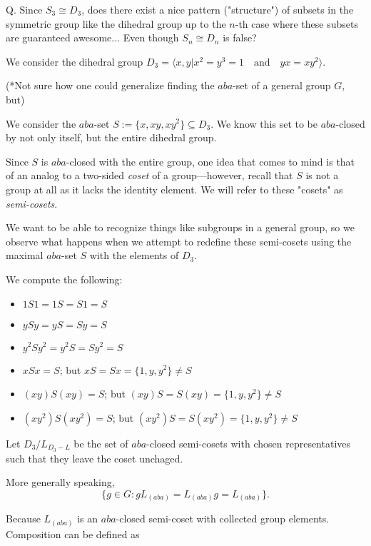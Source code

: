\documentclass[a4paper,12pt]{article}
\begin{document}
Q. Since $S_3 \cong D_3$, does there exist a nice pattern ("structure") of subsets in the symmetric group like the dihedral group up to the $n$-th case where these subsets are guaranteed awesome... Even though $S_n \cong D_n$ is false?

\newpage

We consider the dihedral group $D_{3} = \langle x, y | x^2 = y^3 = 1 \quad \text{and} \quad yx = xy^2\rangle$.

(*Not sure how one could generalize finding the $aba$-set of a general group $G$, but)

We consider the $aba$-set $S := \{x, xy, xy^2\} \subseteq D_{3}$. We know this set to be $aba$-closed by not only itself, but the entire dihedral group.

Since $S$ is $aba$-closed with the entire group, one idea that comes to mind is that of an analog to a two-sided \textit{coset} of a group---however, recall that $S$ is not a group at all as it lacks the identity element. We will refer to these "cosets" as \textit{semi-cosets}.

We want to be able to recognize things like subgroups in a general group, so we observe what happens when we attempt to redefine these semi-cosets using the maximal $aba$-set $S$ with the elements of $D_{3}$.

We compute the following:

\begin{itemize}
    \item $1 S 1 = 1 S = S 1 = S$
    \item $y S y = y S = S y = S$
    \item $y^2 S y^2 = y^2 S = S y^2 = S$
    \item $x S x = S$; but $xS= Sx = \{1, y, y^2\} \neq S$
    \item $(xy) S (xy) = S$; but $(xy) S= S (xy) = \{1, y, y^2\} \neq S$
    \item $(xy^2) S (xy^2) = S$; but $(xy^2) S= S (xy^2) = \{1, y, y^2\} \neq S$
\end{itemize}

Let $D_{3} / L_{D_3 - L}$ be the set of $aba$-closed semi-cosets with chosen representatives such that they leave the coset unchaged.

More generally speaking,
\[
\{ g\in G : gL_{(aba)} = L_{(aba)}g = L_{(aba)}\}.
\]

Because $L_{(aba)}$ is an $aba$-closed semi-coset with collected group elements. Composition can be defined as
\end{document}
